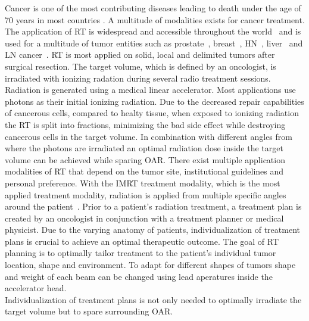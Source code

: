 Cancer is one of the most contributing diseases leading to death under the age of 70 years in most countries \cite{bray_everincreasing_2021}. 
A multitude of modalities exists for cancer treatment. 
The application of \Ac{RT} is widespread and accessible throughout the world~\cite{shahzad_overview_2018} and is used for a multitude of tumor entities such as prostate~\cite{geinitz_3d_2005, nguyen_curative_2005, budiharto_external_nodate}, breast~\cite{ragaz_adjuvant_1997, lena_combined_nodate, taylor_estimating_2017}, \ac{HN}~\cite{datta_head_1990, bhide_advances_2010, castadot_adaptive_2010, morgan_adaptive_2020}, liver~\cite{hoyer_radiotherapy_2012, wulf_stereotactic_2001, wulf_stereotactic_2006, sterzing_stereotactic_2014, witt_mri-guided_2020} and \ac{LN} cancer~\cite{degro_degro_2014, matsushita_stereotactic_2018, mikell_postoperative_2015, lundstedt_long-term_2012, jereczek-fossa_is_2015}.
\acs{RT} is most applied on solid, local and delimited tumors after surgical resection.
The target volume, which is defined by an oncologist, is irradiated with ionizing radation during several radio treatment sessions.
Radiation is generated using a medical linear accelerator. Most applications use photons as their initial ionizing radiation.
Due to the decreased repair capabilities of cancerous cells, compared to healty tissue, when exposed to ionizing radiation the \acs{RT} is split into fractions, minimizing the bad side effect while destroying cancerous cells in the target volume.
In combination with different angles from where the photons are irradiated an optimal radiation dose inside the target volume can be achieved while sparing \ac{OAR}. 
There exist multiple application modalities of \ac{RT} that depend on the tumor site, institutional guidelines and personal preference.
With the \ac{IMRT} treatment modality, which is the most applied treatment modality, radiation is applied from multiple specific angles around the patient~\cite{cho_intensity-modulated_2018}.
Prior to a patient's radiation treatment, a treatment plan is created by an oncologist in conjunction with a treatment planner or medical physicist.
Due to the varying anatomy of patients, individualization of treatment plans is crucial to achieve an optimal therapeutic outcome. 
The goal of \acs{RT} planning is to optimally tailor treatment to the patient's individual tumor location, shape and environment.
To adapt for different shapes of tumors shape and weight of each beam can be changed using lead aperatures inside the accelerator head.\\
Individualization of treatment plans is not only needed to optimally irradiate the target volume but to spare surrounding \ac{OAR}.
